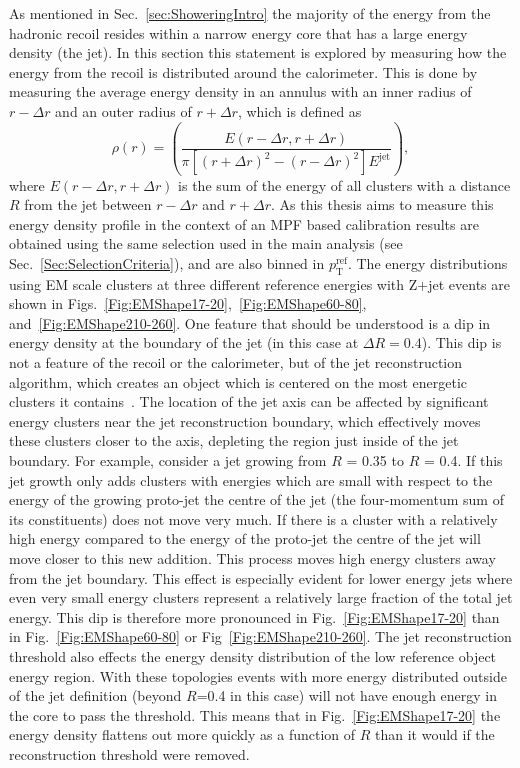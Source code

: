 As mentioned in Sec.~\ref{sec:ShoweringIntro} the majority of the energy from the hadronic recoil resides within a narrow energy core that has a large energy density (the jet).  
In this section this statement is explored by measuring how the energy from the recoil is distributed around the calorimeter.  
This is done by measuring the average energy density in an annulus with an inner radius of $r-\Delta r$ and an outer radius of $r+\Delta r$, which is defined as
\begin{equation}
  \rho\left(r\right)  = \left( \frac{ E\left(r-\Delta r, r+\Delta r\right)}{\pi \left[\left(r +\Delta r\right)^2-\left(r -\Delta r\right)^2\right] E^{\mathrm{jet}}}\right), 
\end{equation}
where $E\left(r-\Delta r, r+\Delta r\right)$ is the sum of the energy of all clusters with a distance $R$ from the jet between $r-\Delta r$ and  $r+\Delta r$.  
As this thesis aims to measure this energy density profile in the context of an MPF based calibration results are obtained using the same selection used in the main analysis (see Sec.~\ref{Sec:SelectionCriteria}), and are also binned in $p_{\mathrm T}^{\mathrm{ref}}$.  
The energy distributions using EM scale clusters at three different reference energies with Z+jet events are shown in Figs.~\ref{Fig:EMShape17-20},~\ref{Fig:EMShape60-80}, and~\ref{Fig:EMShape210-260}.  
One feature that should be understood is a dip in energy density at the boundary of the jet (in this case at $\Delta R = 0.4$).  
This dip is not a feature of the recoil or the calorimeter, but of the jet reconstruction algorithm, which creates an object which is centered on the most energetic clusters it contains~\cite{Choudalakis:1248716}.  
The location of the jet axis can be affected by significant energy clusters near the jet reconstruction boundary, which effectively moves these clusters closer to the axis, depleting the region just inside of the jet boundary.  
For example, consider a jet growing from $R$ = 0.35 to $R$ = 0.4.  
If this jet growth only adds clusters with energies which are small with respect to the energy of the growing proto-jet the centre of the jet (the four-momentum sum of its constituents) does not move very much.  
If there is a cluster with a relatively high energy compared to the energy of the proto-jet the centre of the jet will move closer to this new addition.  
This process moves high energy clusters away from the jet boundary.  
This effect is especially evident for lower energy jets where even very small energy clusters represent a relatively large fraction of the total jet energy.  
This dip is therefore more pronounced in Fig.~\ref{Fig:EMShape17-20} than in Fig.~\ref{Fig:EMShape60-80} or Fig~\ref{Fig:EMShape210-260}.  
The jet reconstruction threshold also effects the energy density distribution of the low reference object energy region.  
With these topologies events with more energy distributed outside of the jet definition (beyond $R$=0.4 in this case) will not have enough energy in the core to pass the threshold.  
This means that in Fig.~\ref{Fig:EMShape17-20} the energy density flattens out more quickly as a function of $R$ than it would if the reconstruction threshold were removed.  


